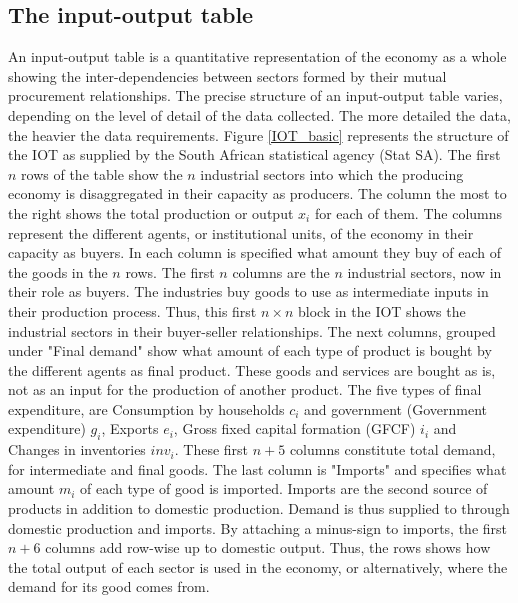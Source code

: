 \documentclass[12pt,english]{article}
\begin{document}


\subsection{The input-output table}

An input-output table is a quantitative representation of the economy as a whole showing the inter-dependencies between sectors formed by their mutual procurement relationships. %
The precise structure of an input-output table varies, %
depending on the level of detail of the data collected. The more detailed the data, the heavier the data requirements. %
Figure \ref{IOT_basic} represents the structure of the IOT as supplied by the South African statistical agency (Stat SA). The first $n$ rows of the table show the $n$ industrial sectors into which the producing economy is disaggregated in their capacity as producers. The column the most to the right shows the total production or output $x_i$ for each of them. The columns represent the different agents, or institutional units, of the economy in their capacity as buyers. In each column is specified what amount they buy of each of the goods in the $n$ rows. The first $n$ columns are the $n$ industrial sectors, now in their role as buyers. The industries buy goods to use as intermediate inputs in their production process. Thus, this first $n \times n$ block in the IOT shows the industrial sectors in their buyer-seller relationships. The next columns, grouped under "Final demand" show what amount of each type of product is bought by the different agents as final product. These goods and services are bought as is, not as an input for the production of another product. The five types of final expenditure, are Consumption by households $c_i$ and government (Government expenditure) $g_i$, Exports $e_i$, Gross fixed capital formation (GFCF) $i_i$ and Changes in inventories $inv_i$. These first $n+5$ columns constitute total demand, for intermediate and final goods. The last column is "Imports" and specifies what amount $m_i$ of each type of good is imported. Imports are the second source of products in addition to domestic production. Demand is thus supplied to through domestic production and imports. By attaching a minus-sign to imports, the first $n+6$ columns add row-wise up to domestic output. Thus, the rows shows how the total output of each sector is used in the economy, or alternatively, where the demand for its good comes from.
\end{document}
